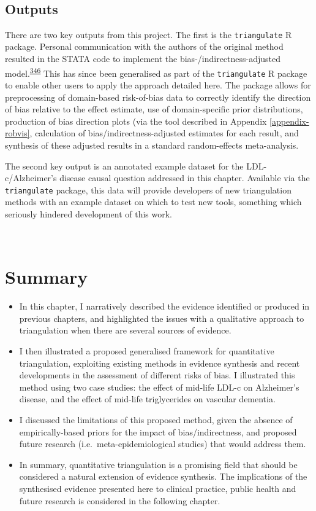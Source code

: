 \documentclass[a4paper, twoside]{templates/ociamthesis}
\begin{document}
~

\hypertarget{tri-software}{%
\subsection{Outputs}\label{tri-software}}

There are two key outputs from this project. The first is the \texttt{triangulate} R package. Personal communication with the authors of the original method resulted in the STATA code to implement the bias-/indirectness-adjusted model.\textsuperscript{\protect\hyperlink{ref-turner2009}{346}} This has since been generalised as part of the \texttt{triangulate} R package to enable other users to apply the approach detailed here. The package allows for preprocessing of domain-based risk-of-bias data to correctly identify the direction of bias relative to the effect estimate, use of domain-specific prior distributions, production of bias direction plots (via the tool described in Appendix \ref{appendix-robvis}, calculation of bias/indirectness-adjusted estimates for each result, and synthesis of these adjusted results in a standard random-effects meta-analysis.

The second key output is an annotated example dataset for the LDL-c/Alzheimer's disease causal question addressed in this chapter. Available via the \texttt{triangulate} package, this data will provide developers of new triangulation methods with an example dataset on which to test new tools, something which seriously hindered development of this work.

~

\hypertarget{summary-6}{%
\section{Summary}\label{summary-6}}

\begin{itemize}
\item
  In this chapter, I narratively described the evidence identified or produced in previous chapters, and highlighted the issues with a qualitative approach to triangulation when there are several sources of evidence.
\item
  I then illustrated a proposed generalised framework for quantitative triangulation, exploiting existing methods in evidence synthesis and recent developments in the assessment of different risks of bias. I illustrated this method using two case studies: the effect of mid-life LDL-c on Alzheimer's disease, and the effect of mid-life triglycerides on vascular dementia.
\item
  I discussed the limitations of this proposed method, given the absence of empirically-based priors for the impact of bias/indirectness, and proposed future research (i.e.~meta-epidemiological studies) that would address them.
\item
  In summary, quantitative triangulation is a promising field that should be considered a natural extension of evidence synthesis. The implications of the synthesised evidence presented here to clinical practice, public health and future research is considered in the following chapter.
\end{itemize}
\end{document}
